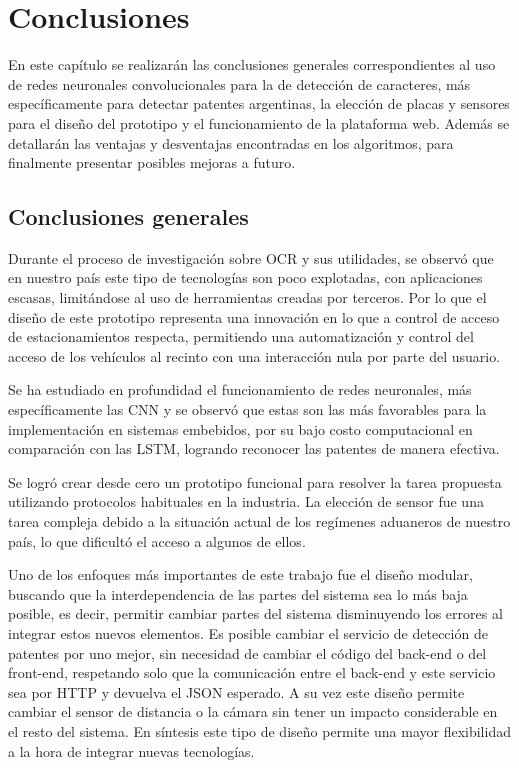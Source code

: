 \chapter{Conclusiones}
En este capítulo se realizarán las conclusiones generales correspondientes al uso de redes neuronales convolucionales para la de detección de caracteres, más específicamente para detectar patentes argentinas, la elección de placas y sensores para el diseño del prototipo y el funcionamiento de la plataforma web. Además se detallarán las ventajas y desventajas encontradas en los algoritmos, para finalmente presentar posibles mejoras a futuro.

\section{Conclusiones generales}

Durante el proceso de investigación sobre OCR y sus utilidades, se observó que en nuestro país este tipo de tecnologías son poco explotadas, con aplicaciones escasas, limitándose al uso de herramientas creadas por terceros.
Por lo que el diseño de este prototipo representa una innovación en lo que a control de acceso de estacionamientos respecta, permitiendo una automatización y control del acceso de los vehículos al recinto con una interacción nula por parte del usuario.

Se ha estudiado en profundidad el funcionamiento de redes neuronales, más específicamente las CNN y se observó que estas son las más favorables para la implementación en sistemas embebidos, por su bajo costo computacional en comparación con las LSTM, logrando reconocer las patentes de manera efectiva.

Se logró crear desde cero un prototipo funcional para resolver la tarea propuesta utilizando protocolos habituales en la industria.
La elección de sensor fue una tarea compleja debido a la situación actual de los regímenes aduaneros de nuestro país, lo que dificultó el acceso a algunos de ellos.

Uno de los enfoques más importantes de este trabajo fue el diseño modular, buscando que la interdependencia de las partes del sistema sea lo más baja posible, es decir, permitir cambiar partes del sistema disminuyendo los errores al integrar estos nuevos elementos.
Es posible cambiar el servicio de detección de patentes por uno mejor, sin necesidad de cambiar el código del back-end o del front-end, respetando solo que la comunicación entre el back-end y este servicio sea por HTTP y devuelva el JSON esperado.
A su vez este diseño permite cambiar el sensor de distancia o la cámara sin tener un impacto considerable en el resto del sistema.
En síntesis este tipo de diseño permite una mayor flexibilidad a la hora de integrar nuevas tecnologías.

